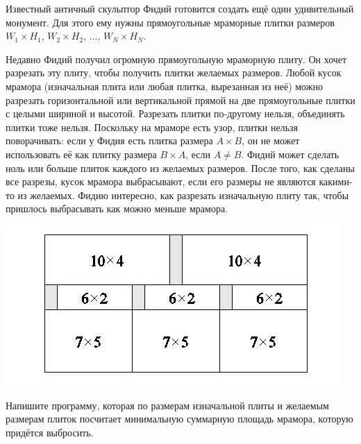 

Известный античный скульптор Фидий готовится создать ещё один
удивительный монумент.
Для этого ему нужны прямоугольные мраморные плитки размеров
$W_1 \times H_1$, $W_2 \times H_2$, $\ldots$, $W_N \times H_N$.

Недавно Фидий получил огромную прямоугольную мраморную плиту.
Он хочет разрезать эту плиту, чтобы получить плитки желаемых размеров.
Любой кусок мрамора (изначальная плита или любая плитка, вырезанная из неё)
можно разрезать горизонтальной или вертикальной прямой на две прямоугольные
плитки с целыми шириной и высотой.
Разрезать плитки по-другому нельзя, объединять плитки тоже нельзя.
Поскольку на мраморе есть узор, плитки нельзя поворачивать:
если у Фидия есть плитка размера $A \times B$, он не может использовать её
как плитку размера $B \times A$, если $A \ne B$.
Фидий может сделать ноль или больше плиток каждого из желаемых размеров.
После того, как сделаны все разрезы, кусок мрамора выбрасывают,
если его размеры не являются какими-то из желаемых.
Фидию интересно, как разрезать изначальную плиту так,
чтобы пришлось выбрасывать как можно меньше мрамора.

\includegraphics{task2b.jpg}

Напишите программу, которая по размерам изначальной плиты и желаемым размерам
плиток посчитает минимальную суммарную площадь мрамора,
которую придётся выбросить.

